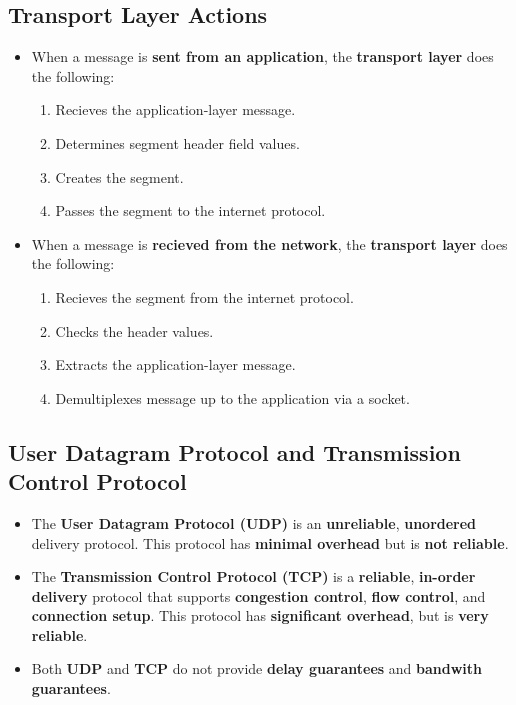 \documentclass[16pt]{article}
\begin{document}
    \subsection*{Transport Layer Actions}
    \begin{itemize}
        \item When a message is \textbf{sent from an application}, the \textbf{transport layer} does the following:
        \begin{enumerate}
            \item Recieves the application-layer message.
            \item Determines segment header field values.
            \item Creates the segment.
            \item Passes the segment to the internet protocol.
        \end{enumerate}
        \item When a message is \textbf{recieved from the network}, the \textbf{transport layer} does the following:
        \begin{enumerate}
            \item Recieves the segment from the internet protocol.
            \item Checks the header values.
            \item Extracts the application-layer message.
            \item Demultiplexes message up to the application via a socket.
        \end{enumerate}
    \end{itemize}

    \subsection*{User Datagram Protocol and Transmission Control Protocol}
    \begin{itemize}
        \item The \textbf{User Datagram Protocol (UDP)} is an \textbf{unreliable}, \textbf{unordered} delivery protocol. This protocol has \textbf{minimal overhead} but is \textbf{not reliable}.
        \item The \textbf{Transmission Control Protocol (TCP)} is a \textbf{reliable}, \textbf{in-order delivery} protocol that supports \textbf{congestion control}, \textbf{flow control}, and \textbf{connection setup}. This protocol has \textbf{significant overhead}, but is \textbf{very reliable}.
        \item Both \textbf{UDP} and \textbf{TCP} do not provide \textbf{delay guarantees} and \textbf{bandwith guarantees}.
    \end{itemize}
\end{document}
